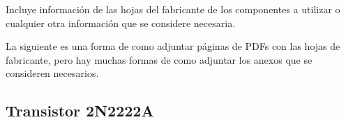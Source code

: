 \documentclass[12pt,letterpaper]{article}     %
\begin{document}
Incluye información de las hojas del fabricante de los componentes a utilizar o cualquier otra información que se considere necesaria.

La siguiente es una forma de como adjuntar páginas de PDFs con las hojas de fabricante, pero hay muchas formas de como adjuntar los anexos que se consideren necesarios.

\subsection{Transistor 2N2222A}




\end{document}
